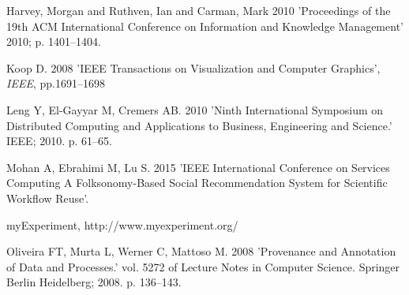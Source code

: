 \documentclass{doublecol-new}
\def\newblock{\hskip .11em plus .33em minus .07em}
\theoremstyle{TH}{
\newtheorem{lemma}{Lemma}
\newtheorem{theorem}[lemma]{Theorem}
\newtheorem{corrolary}[lemma]{Corrolary}
\newtheorem{conjecture}[lemma]{Conjecture}
\newtheorem{proposition}[lemma]{Proposition}
\newtheorem{claim}[lemma]{Claim}
\newtheorem{stheorem}[lemma]{Wrong Theorem}
\newtheorem{algorithm}{Algorithm}
}
\theoremstyle{THrm}{
\newtheorem{definition}{Definition}[section]
\newtheorem{question}{Question}[section]
\newtheorem{remark}{Remark}
\newtheorem{scheme}{Scheme}
}
\theoremstyle{THhit}{
\newtheorem{case}{Case}[section]
}
\begin{document}
\begin{thebibliography}{10}
Harvey, Morgan and Ruthven, Ian and Carman, Mark {2010} 'Proceedings of the 19th ACM International Conference on Information and Knowledge Management' 2010; p. 1401--1404.



Koop D. {2008} 'IEEE Transactions on Visualization and Computer Graphics', {\it IEEE}, pp.1691--1698


Leng Y, El-Gayyar M, Cremers AB. {2010} 'Ninth International Symposium on Distributed Computing and
Applications to Business, Engineering and Science.' IEEE; 2010. p. 61--65.


Mohan A, Ebrahimi M, Lu S. {2015} 'IEEE International Conference on Services Computing A
Folksonomy-Based Social Recommendation System for Scientific Workflow Reuse'.

	
myExperiment, http://www.myexperiment.org/


Oliveira FT, Murta L, Werner C, Mattoso M. {2008} 'Provenance and Annotation of
Data and Processes.' vol. 5272 of Lecture Notes in Computer Science. Springer
Berlin Heidelberg; 2008. p. 136--143.



\end{thebibliography}
\end{document}
